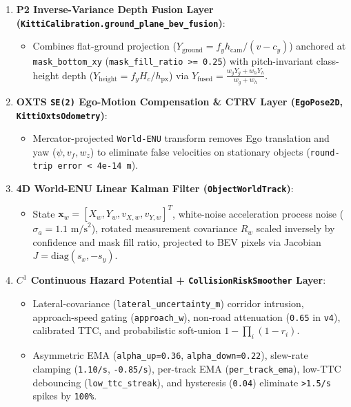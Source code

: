 \documentclass[10.5pt,a4paper]{article}
\begin{document}
\begin{enumerate}[leftmargin=1.8em,itemsep=2pt]
\item \textbf{P2 Inverse-Variance Depth Fusion Layer (\texttt{KittiCalibration.\allowbreak{}ground\_\allowbreak{}plane\_\allowbreak{}bev\_\allowbreak{}fusion})}:
\begin{itemize}[leftmargin=1.5em,itemsep=2pt]
\item Combines flat-ground projection ($Y_{\text{ground}} = f_y h_{\text{cam}} / (v - c_y)$) anchored at \texttt{mask\_\allowbreak{}bottom\_\allowbreak{}xy} (\texttt{mask\_\allowbreak{}fill\_\allowbreak{}ratio >= 0.\allowbreak{}25}) with pitch-invariant class-height depth ($Y_{\text{height}} = f_y H_c / h_{\text{px}}$) via $Y_{\text{fused}} = \frac{w_g Y_g + w_h Y_h}{w_g + w_h}$.
\end{itemize}
\item \textbf{OXTS \texttt{SE(2)} Ego-Motion Compensation \& CTRV Layer (\texttt{EgoPose2D}, \texttt{KittiOxtsOdometry})}:
\begin{itemize}[leftmargin=1.5em,itemsep=2pt]
\item Mercator-projected \texttt{World-\allowbreak{}ENU} transform removes Ego translation and yaw ($\psi, v_f, w_z$) to eliminate false velocities on stationary objects (\texttt{round-\allowbreak{}trip error < 4e-\allowbreak{}14 m}).
\end{itemize}
\item \textbf{4D World-ENU Linear Kalman Filter (\texttt{ObjectWorldTrack})}:
\begin{itemize}[leftmargin=1.5em,itemsep=2pt]
\item State $\mathbf{x}_w = [X_w, Y_w, v_{X,w}, v_{Y,w}]^T$, white-noise acceleration process noise ($\sigma_a = 1.1\text{ m/s}^2$), rotated measurement covariance $R_w$ scaled inversely by confidence and mask fill ratio, projected to BEV pixels via Jacobian $J=\text{diag}(s_x,-s_y)$.
\end{itemize}
\item \textbf{$C^1$ Continuous Hazard Potential + \texttt{CollisionRiskSmoother} Layer}:
\begin{itemize}[leftmargin=1.5em,itemsep=2pt]
\item Lateral-covariance (\texttt{lateral\_\allowbreak{}uncertainty\_\allowbreak{}m}) corridor intrusion, approach-speed gating (\texttt{approach\_\allowbreak{}w}), non-road attenuation (\texttt{0.\allowbreak{}65} in \texttt{v4}), calibrated TTC, and probabilistic soft-union $1 - \prod_i (1 - r_i)$.
\item Asymmetric EMA (\texttt{alpha\_\allowbreak{}up=0.\allowbreak{}36}, \texttt{alpha\_\allowbreak{}down=0.\allowbreak{}22}), slew-rate clamping (\texttt{1.\allowbreak{}10/\allowbreak{}s}, \texttt{-\allowbreak{}0.\allowbreak{}85/\allowbreak{}s}), per-track EMA (\texttt{per\_\allowbreak{}track\_\allowbreak{}ema}), low-TTC debouncing (\texttt{low\_\allowbreak{}ttc\_\allowbreak{}streak}), and hysteresis (\texttt{0.\allowbreak{}04}) eliminate \texttt{>1.\allowbreak{}5/\allowbreak{}s} spikes by \texttt{100\%}.
\end{itemize}
\end{enumerate}
\end{document}
